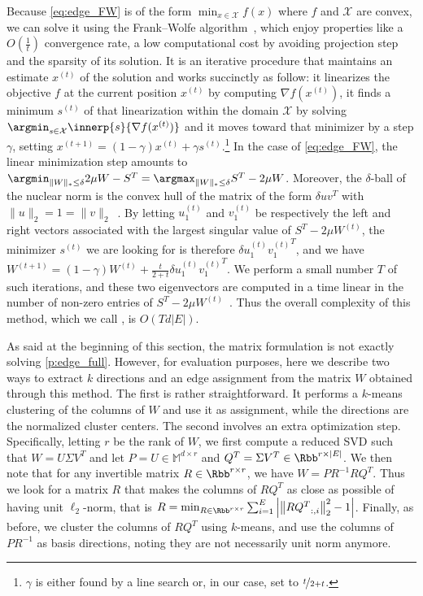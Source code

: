 Because \eqref{eq:edge_FW} is of the form $\min_{x\in \mathcal{X}} f(x)$ where $f$ and $\mathcal{X}$
are convex, we can solve it using the Frank--Wolfe algorithm~\autocites{FrankWolfe56}{Jaggi2013a},
which enjoy properties like a $O(\frac{1}{t})$ convergence rate, a low computational cost by avoiding
projection step and the sparsity of its solution. It is an iterative procedure that maintains an estimate
$x^{(t)}$ of the solution and works succinctly as follow: it linearizes the objective $f$ at the
current position $x^{(t)}$ by computing $\nabla f(x^{(t)})$, it finds a minimum $s^{(t)}$ of that
linearization within the domain $\mathcal{X}$ by solving $\argmin_{s\in \mathcal{X}}
\innerp{s}{\nabla f(x^{(t)})}$ and it moves toward that minimizer by a step $\gamma$, setting
$x^{(t+1)} = (1-\gamma) x^{(t)} + \gamma s^{(t)}$.\footnote{$\gamma$ is either found by a line search or,
in our case, set to $\nicefrac{t}{2+t}$.} In the case of \eqref{eq:edge_FW}, the linear minimization step amounts
to $\argmin_{\|W\|_* \leq \delta} 2\mu W - S^T = \argmax_{\|W\|_* \leq \delta} S^T - 2\mu W$.
Moreover, the $\delta$-ball of the nuclear norm is the convex hull of the matrix of the form $\delta
u v^T$ with $\|u\|_2 = 1 = \|v\|_2$~\autocite{Jaggi2013a}. By letting $u_1^{(t)}$ and $v_1^{(t)}$ be
respectively the left and right vectors associated with the largest singular value of $S^T - 2\mu
W^{(t)}$, the minimizer $s^{(t)}$ we are looking for is therefore $\delta u_1^{(t)} {v_1^{(t)}}^T$,
and we have $W^{(t+1)} = (1-\gamma) W^{(t)} + \frac{t}{2+t} \delta u_1^{(t)} {v_1^{(t)}}^T$. We
perform a small number $T$ of such iterations, and these two eigenvectors are computed in a
time linear in the number of non-zero entries of $S^T - 2\mu W^{(t)}$~\autocite{topEigenvalue92}.
Thus the overall complexity of this method, which we call \fwa{}, is $O(Td|E|)$.

As said at the beginning of this section, the matrix formulation is not exactly solving
\autoref{p:edge_full}. However, for evaluation purposes, here we describe two ways to extract $k$
directions and an edge assignment from the matrix $W$ obtained through this \fwa{} method. The first
is rather straightforward. It performs a $k$-means clustering of the columns of $W$ and use it as
assignment, while the directions are the normalized cluster centers. The second involves an extra
optimization step. Specifically, letting $r$ be the rank of $W$, we first compute a reduced SVD such
that $W = U \Sigma V^T$ and let $P = U \in \mathbb{M}^{d\times r}$ and $Q^T = \Sigma V^T \in \Rbb^{r
\times |E|}$. We then note that for any invertible matrix $R \in \Rbb^{r \times r}$, we have $W =
PR^{-1} RQ^T$. Thus we look for a matrix $R$ that makes the columns of $RQ^T$ as close as possible
of having unit $\ell_2$-norm, that is $R = \min_{R \in \Rbb^{r \times r}} \sum_{i=1}^E \left| \left\|
{RQ^T}_{:,i} \right\|_2^2 - 1 \right|$. Finally, as before,  we cluster the columns of $RQ^T$ using
$k$-means, and use the columns of $PR^{-1}$ as basis directions, noting they are not
necessarily unit norm anymore.

